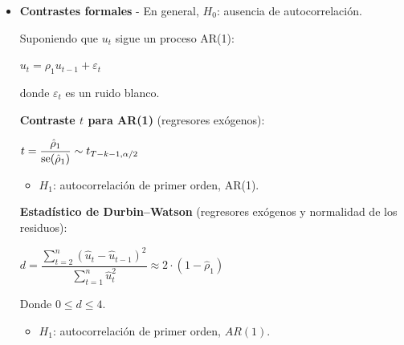 \begin{f}[Detección]
\begin{itemize}[leftmargin=*]
\textbf{Proceso MA(\(q\))}. \underline{FAC}: únicamente los primeros \(q\) coeficientes son significativos; los demás se anulan bruscamente. \underline{FACP}: presenta una rápida disminución exponencial amortiguada o un patrón de ondas sinusoidales.

\textbf{Proceso AR(\(p\))}. \underline{FAC}: presenta una rápida disminución exponencial amortiguada o un patrón de ondas sinusoidales. \underline{FACP}: únicamente los primeros \(p\) coeficientes son significativos; los demás se anulan bruscamente.

\textbf{Proceso ARMA(\(p,q\))}. \underline{FAC} y \underline{FACP}: los coeficientes no se anulan bruscamente y presentan una rápida disminución.

Si los coeficientes de la FAC no disminuyen rápidamente, ello indica claramente una falta de estacionariedad en la media.

\item \textbf{Contrastes formales} - En general, \(H_{0}\): ausencia de autocorrelación.

Suponiendo que \(u_{t}\) sigue un proceso AR(1):

\begin{center}
	\(u_{t}=\rho_{1}u_{t-1}+\varepsilon_{t}\)
\end{center}

donde \(\varepsilon_{t}\) es un ruido blanco.

\textbf{Contraste \(t\) para AR(1)} (regresores exógenos):

\begin{center}
	\(t=\dfrac{\hat{\rho}_{1}}{\mathrm{se}(\hat{\rho}_{1})}\sim t_{T-k-1,\alpha/2}\)
\end{center}

\begin{itemize}[leftmargin=*]
	\item \(H_{1}\): autocorrelación de primer orden, AR(1).
\end{itemize}

\textbf{Estadístico de Durbin--Watson} (regresores exógenos y normalidad de los residuos):

\begin{center}
	\(d=\dfrac{\sum_{t=2}^{n}(\hat{u}_{t}-\hat{u}_{t-1})^{2}}{\sum_{t=1}^{n}\hat{u}_{t}^{2}}\approx2\cdot(1-\hat{\rho}_{1})\)
\end{center}

Donde \(0\leq d\leq4\).

\begin{itemize}[leftmargin=*]
	\item \(H_{1}\): autocorrelación de primer orden, \(AR(1)\).
\end{itemize}
	

\end{itemize}
\end{f}
